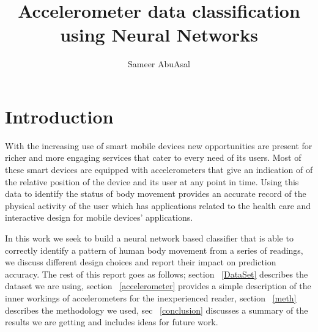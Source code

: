 \documentclass{article}
\title{Accelerometer data classification using Neural Networks}
\author{Sameer AbuAsal}
\date{}
\begin{document}
\maketitle




\pagebreak
\tableofcontents

\pagebreak
\listoffigures

\pagebreak
\listoftables

\pagebreak

%
%
\section{Introduction}
\label{introduction}

With the increasing use of smart mobile devices new opportunities are present for richer and more engaging services 
that cater to every need of its users. Most of these smart devices are equipped with accelerometers that give an
indication of of the relative position of the device and its user at any point in time. Using this data to identify the 
status of body movement provides an accurate record of the physical activity of the user which has applications related 
to the health care and interactive design for mobile devices' applications. 

In this work we seek to build a neural network based classifier that is able to correctly identify a pattern of human body 
movement from a series of readings, we discuss different design choices and report their impact on prediction accuracy. The 
rest of this report goes as follows; section ~\ref{DataSet} describes the dataset we are using, section ~\ref{accelerometer} 
provides a simple description of the inner workings of accelerometers for the inexperienced reader, section ~\ref{meth} describes 
the methodology we used, sec ~\ref{conclusion} discusses a summary of the results we are getting and includes ideas for future work.
\end{document}
